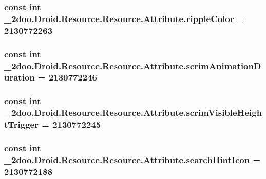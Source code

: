 \hypertarget{class__2doo_1_1_droid_1_1_resource_1_1_attribute_3c7088adde59d92399d0f6e9c7de0f21}{
\subsubsection[{rippleColor}]{\setlength{\rightskip}{0pt plus 5cm}const int \_\-2doo.Droid.Resource.Resource.Attribute.rippleColor = 2130772263}}
\label{class__2doo_1_1_droid_1_1_resource_1_1_attribute_3c7088adde59d92399d0f6e9c7de0f21}


\hypertarget{class__2doo_1_1_droid_1_1_resource_1_1_attribute_00df4d133376ff533dd08043678bf6db}{
\subsubsection[{scrimAnimationDuration}]{\setlength{\rightskip}{0pt plus 5cm}const int \_\-2doo.Droid.Resource.Resource.Attribute.scrimAnimationDuration = 2130772246}}
\label{class__2doo_1_1_droid_1_1_resource_1_1_attribute_00df4d133376ff533dd08043678bf6db}


\hypertarget{class__2doo_1_1_droid_1_1_resource_1_1_attribute_a0114b7027534a2f9602da192abb0bbc}{
\subsubsection[{scrimVisibleHeightTrigger}]{\setlength{\rightskip}{0pt plus 5cm}const int \_\-2doo.Droid.Resource.Resource.Attribute.scrimVisibleHeightTrigger = 2130772245}}
\label{class__2doo_1_1_droid_1_1_resource_1_1_attribute_a0114b7027534a2f9602da192abb0bbc}


\hypertarget{class__2doo_1_1_droid_1_1_resource_1_1_attribute_eee57e30310f3d96009c85715381cc19}{
\subsubsection[{searchHintIcon}]{\setlength{\rightskip}{0pt plus 5cm}const int \_\-2doo.Droid.Resource.Resource.Attribute.searchHintIcon = 2130772188}}
\label{class__2doo_1_1_droid_1_1_resource_1_1_attribute_eee57e30310f3d96009c85715381cc19}


